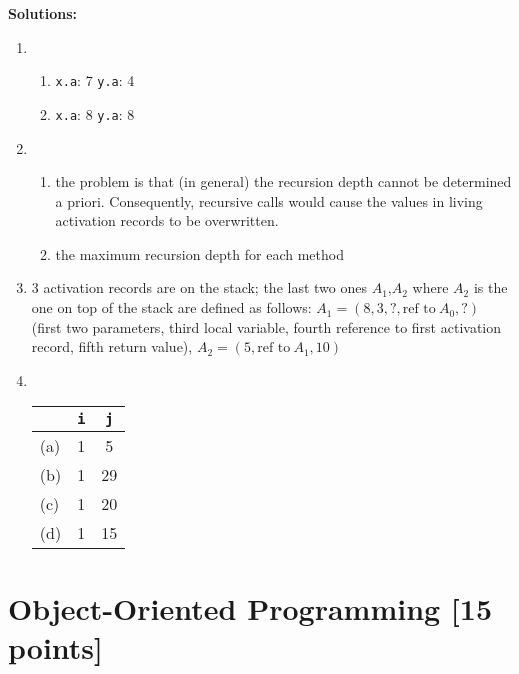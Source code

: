 \documentclass{article}
\newcommand{\solution}[1] {\textbf{Solutions:}\\ #1}
\begin{document}
\solution{
\begin{enumerate}
\item
  \begin{enumerate}   
  \item \lstinline!x.a!: 7 \quad  \lstinline!y.a!: 4
  \item \lstinline!x.a!: 8  \quad \lstinline!y.a!: 8
  \end{enumerate}
\item 
  \begin{enumerate}
  \item the problem is that (in general) the recursion depth cannot be
    determined a priori. Consequently, recursive calls would cause the
    values in living activation records to be overwritten.
  \item the maximum recursion depth for each method
  \end{enumerate}
\item 3 activation records are on the stack; the last two ones
  $A_1$,$A_2$ where $A_2$ is the one on top of the stack are defined
  as follows: $A_1=(8,3,?,\text{ref to}~A_{0} , ?)$ (first two parameters,
  third local variable, fourth reference to first activation record,
  fifth return value), $A_2=(5, \text{ref to}~A_1, 10)$  
\item\hfill\\
  \begin{tabular}{lcc}
    & \lstinline!i! & \lstinline!j! \\ \hline
   (a) &  1 & 5 \\
   (b) & 1 & 29 \\
   (c) & 1 & 20 \\
   (d) & 1 & 15 \\
  \end{tabular}

  
\end{enumerate}
}

\newpage

\section{Object-Oriented Programming [15 points]}
\end{document}
